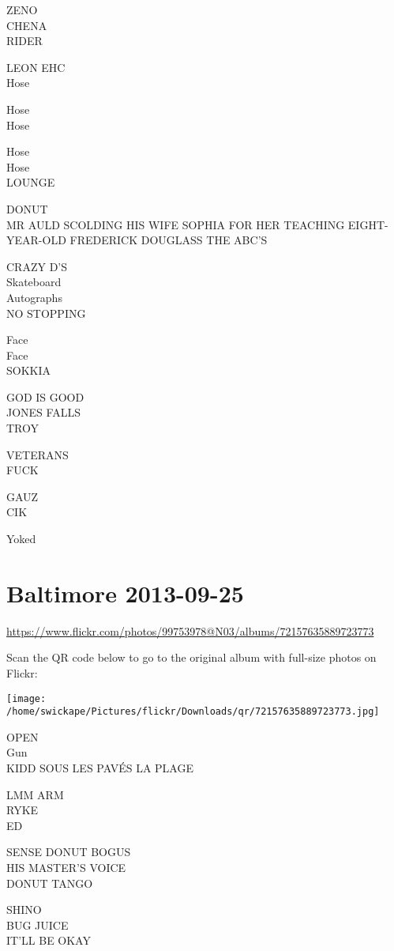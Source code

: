 \documentclass[10pt,letterpaper]{article}
\begin{document}
ZENO\\
CHENA\\
RIDER

LEON EHC\\
Hose

Hose\\
Hose

Hose\\
Hose\\
LOUNGE

DONUT\\
MR AULD SCOLDING HIS WIFE SOPHIA FOR HER TEACHING EIGHT{-}YEAR{-}OLD FREDERICK DOUGLASS THE ABC'S

CRAZY D'S\\
Skateboard\\
Autographs\\
NO STOPPING

Face\\
Face\\
SOKKIA

GOD IS GOOD\\
JONES FALLS\\
TROY

VETERANS\\
FUCK

GAUZ\\
CIK

Yoked


\section*{Baltimore 2013-09-25}

\url{https://www.flickr.com/photos/99753978@N03/albums/72157635889723773}

Scan the QR code below to go to the original album with full-size photos on Flickr:

\texttt{[image: /home/swickape/Pictures/flickr/Downloads/qr/72157635889723773.jpg]}


OPEN\\
Gun\\
KIDD SOUS LES PAVÉS LA PLAGE

LMM ARM\\
RYKE\\
ED

SENSE DONUT BOGUS\\
HIS MASTER'S VOICE\\
DONUT TANGO

SHINO\\
BUG JUICE\\
IT'LL BE OKAY
\end{document}
